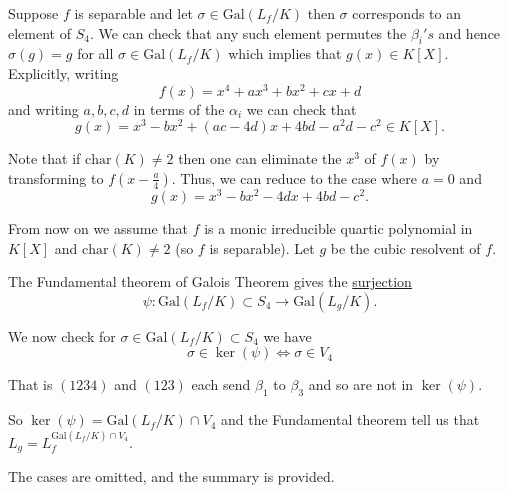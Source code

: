 \documentclass[12pt, a4paper]{article}
\newcommand{\gal}{\text{Gal}}
\begin{document}
Suppose \(f\) is separable and let \(\sigma \in \gal(L_f/K)\) then \(\sigma\) corresponds to an element of \(S_4\). We can check that any such element permutes the \(\beta_i's\) and hence \(\sigma(g)=g\) for all \(\sigma \in \gal(L_f/K)\) which implies that \(g(x)\in K[X]\). Explicitly, writing 
\[f(x)=x^4+ax^3+bx^2+cx+d\] and writing \(a,b,c,d\) in terms of the \(\alpha_i\) we can check that 
\[g(x)=x^3-bx^2+(ac-4d)x+4bd-a^2d-c^2 \in K[X].\]

Note that if \(\text{char}(K)\neq 2\) then one can eliminate the \(x^3\) of \(f(x)\) by transforming to \(f\left( x-\frac{a}{4} \right)\). Thus, we can reduce to the case where \(a=0\) and 
\[g(x)=x^3-bx^2-4dx+4bd-c^2.\]

From now on we assume that \(f\) is a monic irreducible quartic polynomial in \(K[X]\) and \(\text{char}(K)\neq 2\) (so \(f\) is separable). Let \(g\) be the cubic resolvent of \(f\). 

The Fundamental theorem of Galois Theorem gives the \ul{surjection} 
\[\psi : \gal(L_f/K) \subset S_4 \to \gal(L_g/K).\]

We now check for \(\sigma\in \gal(L_f/K) \subset S_4\) we have 
\[\sigma\in \ker(\psi) \iff \sigma\in V_4\]

\begin{mdnote}
    That is \((1234)\) and \((123)\) each send \(\beta_1\) to \(\beta_3\) and so are not in \(\ker(\psi)\). 
\end{mdnote}

So \(\ker(\psi) = \gal(L_f/K) \cap V_4\) and the Fundamental theorem tell us that \(L_g = L_f^{\gal(L_f/K) \cap V_4}\).

\begin{mdremark}
    The cases are omitted, and the summary is provided.
\end{mdremark}
\end{document}
